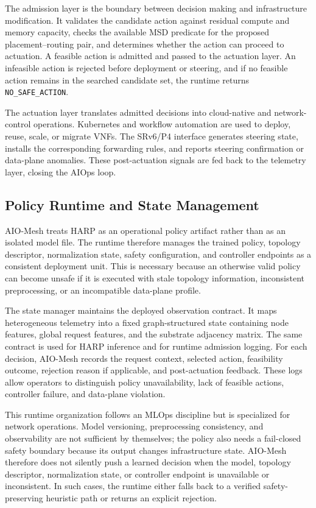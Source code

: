 \documentclass[final,5p]{elsarticle}
\newcommand{\rev}[1]{\textcolor{BrickRed}{#1}}
\begin{document}
The admission layer is the boundary between decision making and infrastructure modification. It validates the candidate action against residual compute and memory capacity, \rev{checks the available MSD predicate for the proposed placement--routing pair}, and determines whether the action can proceed to actuation. A feasible action is admitted and passed to the actuation layer. An infeasible action is rejected before deployment or steering, and if no feasible action remains \rev{in the searched candidate set}, the runtime returns \texttt{NO\_SAFE\_ACTION}.

The actuation layer translates admitted decisions into cloud-native and network-control operations. Kubernetes and workflow automation are used to deploy, reuse, scale, or migrate VNFs. The SRv6/P4 interface generates steering state, installs the corresponding forwarding rules, and reports steering confirmation or data-plane anomalies. These post-actuation signals are fed back to the telemetry layer, closing the AIOps loop.

\subsection{Policy Runtime and State Management}
\label{subsec:policy_runtime}

AIO-Mesh treats HARP as an operational policy artifact rather than as an isolated model file. The runtime therefore manages the trained policy, topology descriptor, normalization state, safety configuration, and controller endpoints as a consistent deployment unit. This is necessary because an otherwise valid policy can become unsafe if it is executed with stale topology information, inconsistent preprocessing, or an incompatible data-plane profile.

The state manager maintains the deployed observation contract. It maps heterogeneous telemetry into a fixed graph-structured state containing node features, global request features, and the substrate adjacency matrix. The same contract is used for HARP inference and for runtime admission logging. For each decision, AIO-Mesh records the request context, selected action, feasibility outcome, rejection reason if applicable, and post-actuation feedback. These logs allow operators to distinguish policy unavailability, lack of feasible actions, controller failure, and data-plane violation.

This runtime organization follows an MLOps discipline but is specialized for network operations. Model versioning, preprocessing consistency, and observability are not sufficient by themselves; the policy also needs a fail-closed safety boundary because its output changes infrastructure state. AIO-Mesh therefore does not silently push a learned decision when the model, topology descriptor, normalization state, or controller endpoint is unavailable or inconsistent. In such cases, the runtime either falls back to a verified safety-preserving heuristic path or returns an explicit rejection.
\end{document}
